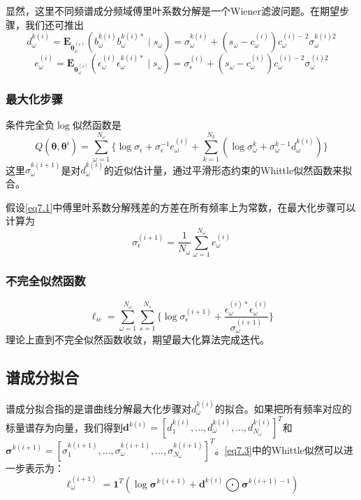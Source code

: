 显然，这里不同频谱成分频域傅里叶系数分解是一个Wiener滤波问题。在期望步骤，我们还可推出
\begin{equation}\label{eq7.6}
d_\omega^{k(i)}=\mathbf{E}_{\mathbf{\theta}_\omega^{(i)}}(b_\omega^{k(i)}b_\omega^{k(i)*}\mid{s}_\omega)=\sigma_\omega^{k(i)}+(s_\omega-c_\omega^{(i)})c_\omega^{(i)-2}\sigma_\omega^{k(i)2}
\end{equation}
\begin{equation}\label{eq7.7}
e_\omega^{(i)}=\mathbf{E}_{\mathbf{\theta}_\omega^{(i)}}(\epsilon_\omega^{(i)}\epsilon_\omega^{k(i)*}\mid{s}_\omega)=\sigma_\epsilon^{(i)}+(s_\omega-c_\omega^{(i)})c_\omega^{(i)-2}\sigma_\omega^{(i)2}
\end{equation}

\subsubsection{最大化步骤}
条件完全负$\log$似然函数是
\begin{equation}\label{eq7.8}
Q(\mathbf{\theta},\mathbf{\theta}^{i})=\sum_{\omega=1}^{N_\omega}\lbrace\log{\sigma_\epsilon}+\sigma_\epsilon^{-1}e_\omega^{(i)}+\sum_{k=1}^{N_k}(\log{\sigma}_\omega^k+\sigma_\omega^{k-1}d_\omega^{k(i)})\rbrace
\end{equation}
这里$\sigma_\omega^{k(i+1)}$是对$d_\omega^{k(i)}$的近似估计量，通过平滑形态约束的Whittle似然函数来拟合。

假设\eqref{eq7.1}中傅里叶系数分解残差的方差在所有频率上为常数，在最大化步骤可以计算为
\begin{equation}\label{eq7.9}
\sigma_\epsilon^{(i+1)}=\frac{1}{N_\omega}\sum_{\omega=1}^{N_\omega}e_\omega^{(i)}
\end{equation}

\subsubsection{不完全似然函数}
\begin{equation}\label{eq7.10}
\ell_{ic}=\sum_{\omega=1}^{N_\omega}\sum_{s=1}^{N_s}\lbrace\log{\sigma_\epsilon^{(i+1)}}+\frac{\epsilon_\omega^{(i)*}\epsilon_\omega^{(i)}}{\sigma_\omega^{(i+1)}}\rbrace
\end{equation}
理论上直到不完全似然函数收敛，期望最大化算法完成迭代。

\subsection{谱成分拟合}
谱成分拟合指的是谱曲线分解最大化步骤对$d_\omega^{k(i)}$的拟合。如果把所有频率对应的标量谱存为向量，我们得到$\mathbf{d}^{k(i)}=[d_1^{k(i)},...,d_\omega^{k(i)},...,d_{N_\omega}^{k(i)}]^T$和$\mathbf{\sigma}^{k(i+1)}=[\sigma_1^{k(i+1)},...,\sigma_\omega^{k(i+1)},...,\sigma_{N_\omega}^{k(i+1)}]^T$。\eqref{eq7.3}中的Whittle似然可以进一步表示为：
\begin{equation}\label{eq7.11}
\ell_\omega^{(i+1)}=\mathbf{1}^T(\log{\mathbf{\sigma}}^{k(i+1)}+\mathbf{d}^{k(i)}\bigodot{\mathbf{\sigma}^{k(i+1)-1}})
\end{equation}

